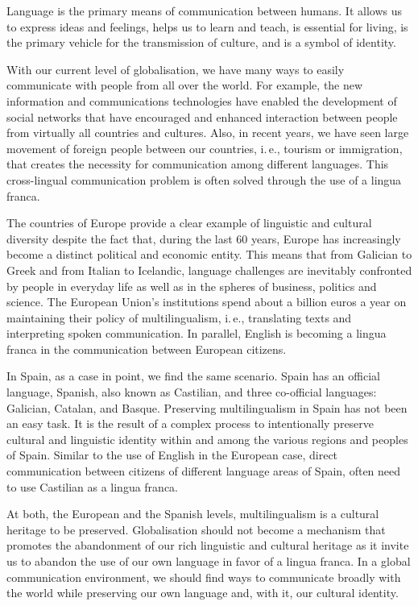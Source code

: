 \begin{multicols}{2}

Language is the primary means of communication between humans. It allows us to express ideas and feelings, helps us to learn and teach, is essential for living, is the primary vehicle for the transmission of culture, and is a symbol of identity.

With our current level of globalisation, we have many ways to easily communicate with people from all over the world. For example, the new information and communications technologies have enabled the development of social networks that have encouraged and enhanced   interaction between people from virtually all countries and cultures. Also, in recent years, we have seen large movement of foreign people between our countries, i.\,e., tourism or immigration, that creates the necessity for communication among different languages. This cross-lingual communication problem is often solved through the use of a lingua franca.


The countries of Europe provide a clear example of linguistic and cultural diversity despite the fact that, during the last 60 years, Europe has increasingly become a distinct political and economic entity. This means that from Galician to Greek and from Italian to Icelandic, language challenges are inevitably confronted by people in everyday life as well as in the spheres of business, politics and science. The European Union’s institutions spend about a billion euros a year on maintaining their policy of multilingualism, i.\,e., translating texts and interpreting spoken communication. In parallel, English is becoming a lingua franca in the communication between European citizens.

In Spain, as a case in point, we find the same scenario. Spain has an official language, Spanish, also known as Castilian, and three co-official languages: Galician, Catalan, and Basque. Preserving multilingualism in Spain has not been an easy task. It is the result of a complex process to intentionally preserve cultural and linguistic identity within and among the various regions and peoples of Spain. Similar to the use of English in the European case, direct communication between citizens of different language areas of Spain, often need to use Castilian as a lingua franca.

At both, the European and the Spanish levels, multilingualism is a cultural heritage to be preserved. Globalisation should not become a mechanism that promotes the abandonment of our rich linguistic and cultural heritage as it invite us to abandon the use of our own language in favor of a lingua franca. In a global communication environment, we should find ways to communicate broadly with the world while preserving our own language and, with it, our cultural identity.


\end{multicols}
